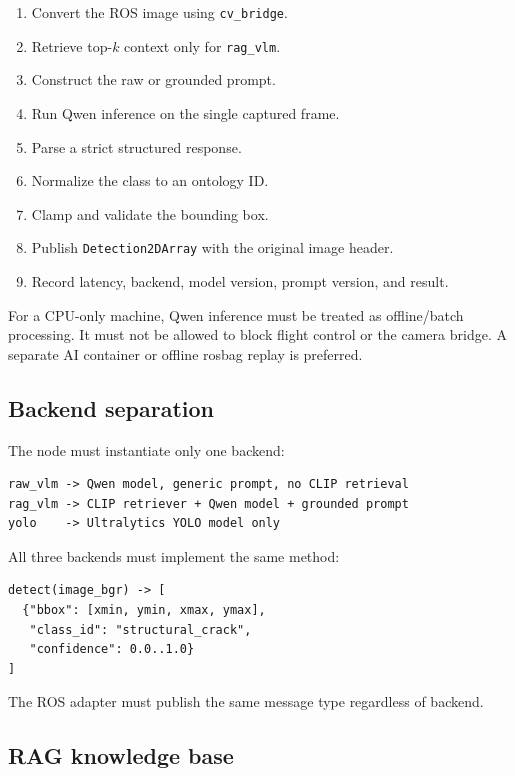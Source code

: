 \documentclass[11pt,a4paper]{article}
\newcommand{\code}[1]{\texttt{\small #1}}
\begin{document}
\begin{enumerate}[leftmargin=1.2cm]
\item Convert the ROS image using \code{cv\_bridge}.
\item Retrieve top-$k$ context only for \code{rag\_vlm}.
\item Construct the raw or grounded prompt.
\item Run Qwen inference on the single captured frame.
\item Parse a strict structured response.
\item Normalize the class to an ontology ID.
\item Clamp and validate the bounding box.
\item Publish \code{Detection2DArray} with the original image header.
\item Record latency, backend, model version, prompt version, and result.
\end{enumerate}

For a CPU-only machine, Qwen inference must be treated as offline/batch
processing. It must not be allowed to block flight control or the camera
bridge. A separate AI container or offline rosbag replay is preferred.

\subsection{Backend separation}

The node must instantiate only one backend:

\begin{verbatim}
raw_vlm -> Qwen model, generic prompt, no CLIP retrieval
rag_vlm -> CLIP retriever + Qwen model + grounded prompt
yolo    -> Ultralytics YOLO model only
\end{verbatim}

All three backends must implement the same method:

\begin{verbatim}
detect(image_bgr) -> [
  {"bbox": [xmin, ymin, xmax, ymax],
   "class_id": "structural_crack",
   "confidence": 0.0..1.0}
]
\end{verbatim}

The ROS adapter must publish the same message type regardless of backend.

\subsection{RAG knowledge base}
\end{document}
